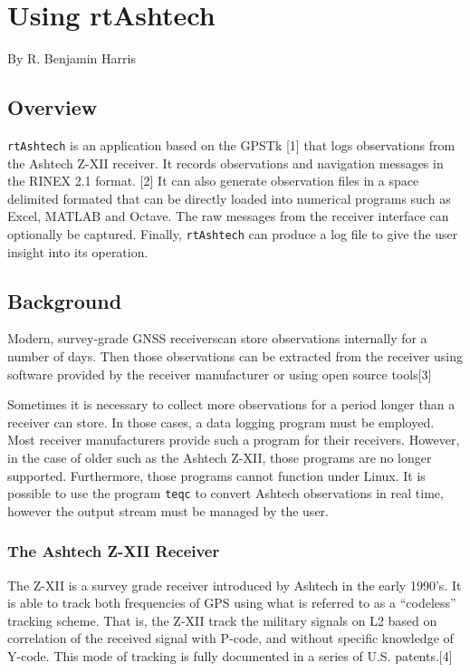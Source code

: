 \chapter{Using rtAshtech}

By R. Benjamin Harris

\section{Overview}

\texttt{rtAshtech} is an application based on the GPSTk [1] that logs 
observations from the Ashtech Z-XII receiver. It records observations and 
navigation messages in the RINEX 2.1 format. [2] It can also 
generate observation files in a space delimited formated 
that can be directly loaded into numerical programs
such as Excel, MATLAB and Octave. The raw messages from the receiver 
interface can optionally be captured. Finally, \texttt{rtAshtech} 
can produce a log file to give the user insight into its operation.


\section{Background}

Modern, survey-grade GNSS receiverscan store observations internally
for a number of days. Then those observations can be extracted from the
receiver using software provided by the receiver manufacturer or using
open source tools[3]

Sometimes it is necessary to collect more observations for a period longer
than a receiver can store. In those cases, a data logging program must be
employed. Most receiver manufacturers provide such a program for their 
receivers. However, in the case of older such as the Ashtech Z-XII,
those programs are no longer supported. Furthermore, those programs
cannot function under Linux. It is possible to use the program 
\texttt{teqc} to convert
Ashtech observations in real time, however the output stream must
be managed by the user. 


\subsection{The Ashtech Z-XII Receiver}

The Z-XII is a survey grade receiver introduced by Ashtech in the early 1990's.
It is able to track both frequencies of GPS using what is referred to as a 
``codeless'' tracking scheme. That is, the Z-XII track the military signals on
L2 based on correlation of the received signal with P-code, and without 
specific knowledge of Y-code. This mode of tracking is fully documented in
a series of U.S. patents.[4]

